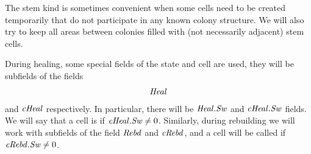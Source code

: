 \documentclass[12pt]{memoir}
\newcommand{\fld}[1]{\ensuremath{\textit{#1\/}}}
\newcommand{\Z}{Z}
\newcommand{\Addr}{\fld{Addr}}
\newcommand{\cAddr}{\fld{cAddr}}
\newcommand{\Core}{\fld{Core}}
\newcommand{\cCore}{\fld{cCore}}
\newcommand{\Drift}{\fld{Drift}}
\newcommand{\cDrift}{\fld{cDrift}}
\newcommand{\Kind}{\fld{Kind}}
\newcommand{\cKind}{\fld{cKind}}
\newcommand{\Heal}{\fld{Heal}}
\newcommand{\cHeal}{\fld{cHeal}}
\newcommand{\Rebd}{\fld{Rebd}}
\newcommand{\cRebd}{\fld{cRebd}}
\newcommand{\Sweep}{\fld{Sw}}
\newcommand{\cSweep}{\fld{cSw}}
\newcommand{\ZigDepth}{\fld{ZigDepth}}
\newcommand{\ZigDir}{\fld{ZigDir}}
\newcommand{\Stem}{\mathrm{Stem}}
\begin{document}
The stem kind is sometimes convenient when some cells need to be created temporarily
that do not participate in any known colony structure.
We will also try to keep all areas between colonies filled with (not necessarily adjacent)
stem cells.





During healing, some special fields of the state and cell are used, they will be subfields of 
the fields
 \begin{align}\label{eq:Heal}
   \Heal
 \end{align} 
and \( \cHeal \) respectively.
In particular, there will be \( \Heal.\Sweep \) and \( \cHeal.\Sweep \) fields.
We will say that a cell is  if \( \cHeal.\Sweep\ne 0 \).
Similarly, during rebuilding we will work with subfields of the field \( \Rebd \) and
\( \cRebd \), and a cell will be called  if \( \cRebd.\Sweep\ne 0 \).

\end{document}
